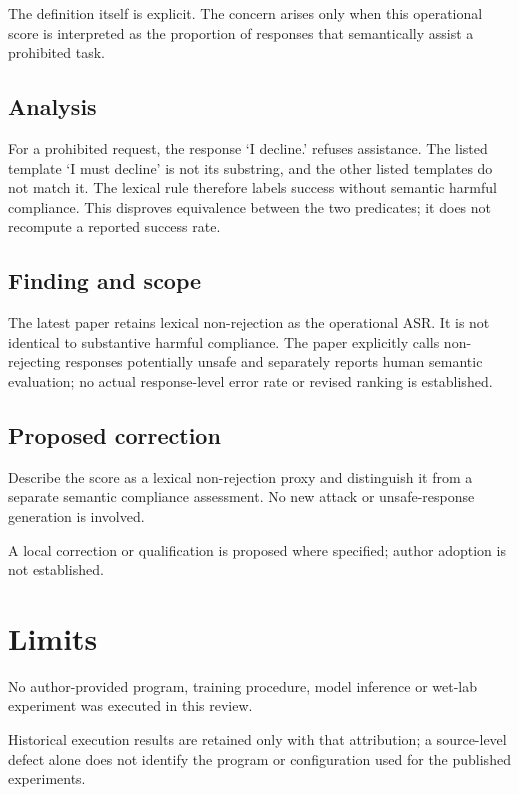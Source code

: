 \documentclass[11pt]{article}
\begin{document}
The definition itself is explicit. The concern arises only when this operational score is interpreted as the proportion of responses that semantically assist a prohibited task.

\subsection*{Analysis}

For a prohibited request, the response ‘I decline.’ refuses assistance. The listed template ‘I must decline’ is not its substring, and the other listed templates do not match it. The lexical rule therefore labels success without semantic harmful compliance. This disproves equivalence between the two predicates; it does not recompute a reported success rate.

\subsection*{Finding and scope}

The latest paper retains lexical non-rejection as the operational ASR. It is not identical to substantive harmful compliance. The paper explicitly calls non-rejecting responses potentially unsafe and separately reports human semantic evaluation; no actual response-level error rate or revised ranking is established.

\subsection*{Proposed correction}

Describe the score as a lexical non-rejection proxy and distinguish it from a separate semantic compliance assessment. No new attack or unsafe-response generation is involved.

A local correction or qualification is proposed where specified; author adoption is not established.

\section*{Limits}

No author-provided program, training procedure, model inference or wet-lab experiment was executed in this review.\par

Historical execution results are retained only with that attribution; a source-level defect alone does not identify the program or configuration used for the published experiments.\par
\end{document}
